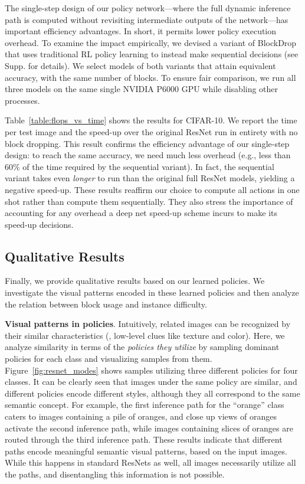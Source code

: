 \documentclass[10pt,twocolumn,letterpaper]{article}
\newcommand{\system}{BlockDrop\xspace}
\begin{document}
The single-step design of our policy network---where the full  dynamic inference path is computed without revisiting intermediate outputs of the network---has important efficiency advantages.  In short, it permits lower policy execution overhead.  To examine the impact empirically, we devised a variant of \system that uses traditional RL policy learning to instead make sequential decisions (see Supp. for details).  
We select models of both variants that attain equivalent accuracy, with the same number of blocks. To ensure fair comparison, we run all three models on the same single NVIDIA P6000 GPU while disabling other processes.

Table~\ref{table:flops_vs_time} shows the results for CIFAR-10.  We report the time per test image and the speed-up over the original ResNet run in entirety with no block dropping.  
This result confirms the efficiency advantage of our single-step design: to reach the same accuracy, we need much less overhead (e.g., less than 60\% of the time required by the sequential variant).  In fact, the sequential variant takes even \emph{longer} to run than the original full ResNet models, yielding a negative speed-up.  These results reaffirm our choice to compute all actions in one shot rather than compute them sequentially.  They also stress the importance of accounting for any overhead a deep net speed-up scheme incurs to make its speed-up decisions.

\subsection{Qualitative Results}
Finally, we provide qualitative results based on our learned policies.  %
We investigate the visual patterns encoded in these learned policies and then analyze the relation between block usage and instance difficulty.

\vspace{0.05in}\noindent\textbf{Visual patterns in policies}. Intuitively, related images can be recognized by their similar characteristics (\eg, low-level clues like texture and color). Here, we analyze similarity in terms of the \emph{policies they utilize} by sampling dominant policies for each class and visualizing samples from them. 
Figure~\ref{fig:resnet_modes} shows samples utilizing three different policies for four classes. It can be clearly seen that images under the same policy are similar, and different policies encode different styles, although they all correspond to the same semantic concept. For example, the first inference path for the ``orange'' class caters to images containing a pile of oranges, and close up views of oranges activate the second inference path, while images containing slices of oranges are routed through the third inference path. These results indicate that different paths encode meaningful semantic visual patterns, based on the input images. While this happens in standard ResNets as well, all images necessarily utilize all the paths, and disentangling this information is not possible.
\end{document}

